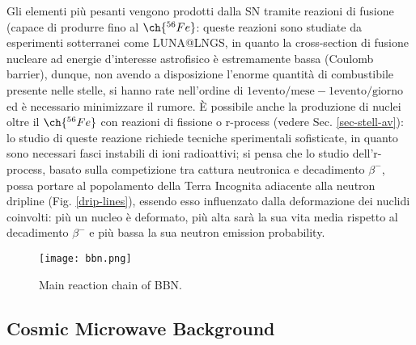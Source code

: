 Gli elementi più pesanti vengono prodotti dalla SN tramite reazioni di fusione (capace di produrre fino al $ \ch{^{56} Fe} $: queste reazioni sono studiate da esperimenti sotterranei come LUNA@LNGS, in quanto la cross-section di fusione nucleare ad energie d'interesse astrofisico è estremamente bassa (Coulomb barrier), dunque, non avendo a disposizione l'enorme quantità di combustibile presente nelle stelle, si hanno rate nell'ordine di $ 1 \text{evento} / \text{mese} - 1 \text{evento} / \text{giorno} $ ed è necessario minimizzare il rumore. È possibile anche la produzione di nuclei oltre il $ \ch{^{56} Fe} $ con reazioni di fissione o r-process (vedere Sec. \ref{sec-stell-av}): lo studio di queste reazione richiede tecniche sperimentali sofisticate, in quanto sono necessari fasci instabili di ioni radioattivi; si pensa che lo studio dell'r-process, basato sulla competizione tra cattura neutronica e decadimento $ \beta^- $, possa portare al popolamento della Terra Incognita adiacente alla neutron dripline (Fig. \ref{drip-lines}), essendo esso influenzato dalla deformazione dei nuclidi coinvolti: più un nucleo è deformato, più alta sarà la sua vita media rispetto al decadimento $ \beta^- $ e più bassa la sua neutron emission probability.

\begin{figure}[b]
	\centering
	\texttt{[image: bbn.png]}
	\caption{Main reaction chain of BBN.}
	\label{bbn}
\end{figure}

\subsection{Cosmic Microwave Background}
\label{sec-cmbr}

